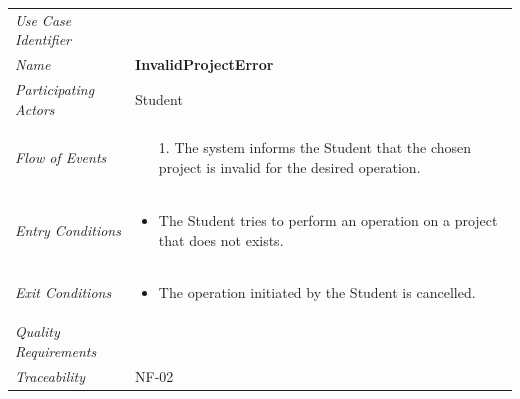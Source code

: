 \documentclass[12pt,letterpaper]{article}
\begin{document}
\begin{center}
	\begin{tabu} to 
		\toprule
		Use Case Identifier & \invalidprojecterror{} \\
		Name & {\bf InvalidProjectError} \\
		Participating Actors & Student \\
		Flow of Events & 
		\begin{minipage}[t]{\linewidth}
		    \begin{enumerate}
			    \item[1.] The system informs the Student that the chosen project is invalid for the desired operation.
			\end{enumerate}
        \end{minipage} \\

		Entry Conditions &
		\begin{minipage}[t]{\linewidth}
			\begin{itemize}
			    \item The Student tries to perform an operation on a project that does not exists.
	        \end{itemize}
        \end{minipage} \\

		Exit Conditions &
		\begin{minipage}[t]{\linewidth}
			\begin{itemize}
			    \item The operation initiated by the Student is cancelled.
	        \end{itemize}
        \end{minipage} \\

		Quality Requirements & \\

		Traceability & NF-02 \\
		\toprule
	\end{tabu}
\end{center}
\end{document}
